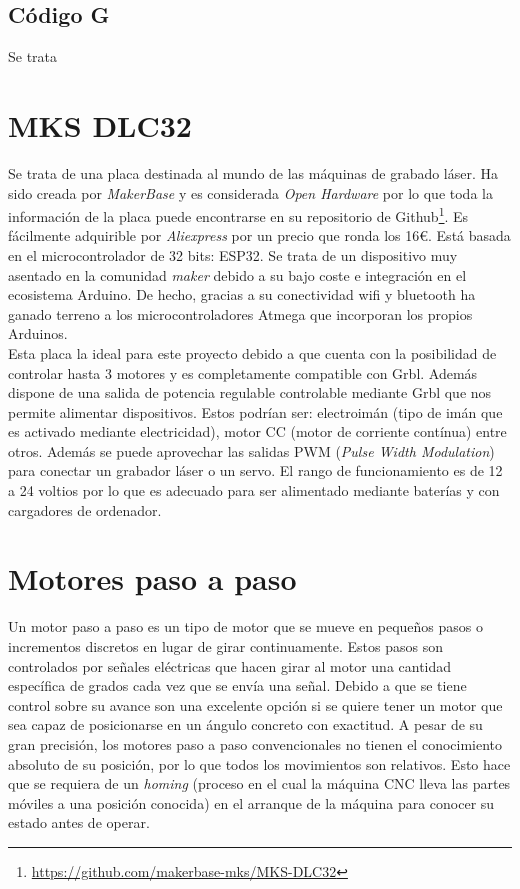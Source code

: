 \subsection{Código G}
\label{sec:gcode}
Se trata 

\section{MKS DLC32}
\label{sec:mksdlc32}
Se trata de una placa destinada al mundo de las máquinas de grabado láser. Ha sido creada por \textit{MakerBase} y es considerada 
\textit{Open Hardware} por lo que toda la información de la placa puede encontrarse en su repositorio de Github\footnote{\url{https://github.com/makerbase-mks/MKS-DLC32}}.
Es fácilmente adquirible por \textit{Aliexpress} por un precio que ronda los 16\euro. Está basada en el microcontrolador de 32 bits: ESP32. 
Se trata de un dispositivo muy asentado en la comunidad \textit{maker} debido a su bajo coste e integración en el 
ecosistema Arduino. De hecho, gracias a su conectividad wifi y bluetooth ha ganado terreno a los microcontroladores Atmega que incorporan los propios Arduinos.\\
Esta placa la ideal para este proyecto debido a que cuenta con la posibilidad de controlar 
hasta 3 motores y es completamente compatible con Grbl. Además dispone de una salida de potencia regulable controlable mediante Grbl que nos 
permite alimentar dispositivos. Estos podrían ser: electroimán (tipo de imán que es activado mediante electricidad), motor CC (motor de corriente 
contínua) entre otros. Además se puede aprovechar las salidas PWM (\textit{Pulse Width Modulation}) para conectar un grabador láser o un servo. 
El rango de funcionamiento es de 12 a 24 voltios por lo que es adecuado para ser alimentado mediante baterías y con cargadores de ordenador. 

\section{Motores paso a paso}
\label{sec:motores}
Un motor paso a paso es un tipo de motor que se mueve en pequeños pasos o incrementos discretos en lugar de girar continuamente. Estos pasos 
son controlados por señales eléctricas que hacen girar al motor una cantidad específica de grados cada vez que se envía una señal. Debido a que se tiene 
control sobre su avance son una excelente opción si se quiere tener un motor que sea capaz de posicionarse en un ángulo concreto con exactitud. A pesar
de su gran precisión, los motores paso a paso convencionales no tienen el conocimiento absoluto de su posición, por lo que todos los movimientos son 
relativos. Esto hace que se requiera de un \textit{homing} (proceso en el cual la máquina CNC lleva las partes móviles a una 
posición conocida) en el arranque de la máquina para conocer su estado antes de operar.

